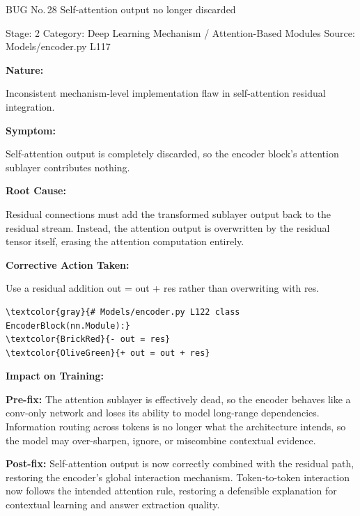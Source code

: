 \documentclass[10pt]{article}
\newcommand{\FieldLabel}[1]{%
 {\bfseries #1:}\par
}
\begin{document}
\begin{bugbox}{BUG No.\,28 \quad Self-attention output no longer discarded}
{\color{MetaGray}\small Stage: 2 \;\textbar\; Category: Deep Learning Mechanism / Attention-Based Modules \;\textbar\; Source: Models/encoder.py L117\par}
\vspace{0.22em}
\FieldLabel{Nature}
Inconsistent mechanism-level implementation flaw in self-attention residual integration.
\par
\vspace{0.35em}
\FieldLabel{Symptom}
Self-attention output is completely discarded, so the encoder block's attention sublayer contributes nothing.
\par
\vspace{0.35em}
\FieldLabel{Root Cause}
Residual connections must add the transformed sublayer output back to the residual stream. Instead, the attention output is overwritten by the residual tensor itself, erasing the attention computation entirely.
\par
\vspace{0.35em}
\FieldLabel{Corrective Action Taken}
Use a residual addition out = out + res rather than overwriting with res.
\par
\vspace{0.35em}
\begin{Verbatim}[commandchars=\\\{\},fontsize=\footnotesize,breaklines=true,breaksymbol={},frame=leftline,framerule=2pt,rulecolor=\color{gray!40},xleftmargin=6pt,formatcom=\singlespacing]
\textcolor{gray}{# Models/encoder.py L122 class EncoderBlock(nn.Module):}
\textcolor{BrickRed}{- out = res}
\textcolor{OliveGreen}{+ out = out + res}
\end{Verbatim}
\vspace{0.22em}
\FieldLabel{Impact on Training}
\textbf{Pre-fix:} The attention sublayer is effectively dead, so the encoder behaves like a conv-only network and loses its ability to model long-range dependencies. Information routing across tokens is no longer what the architecture intends, so the model may over-sharpen, ignore, or miscombine contextual evidence. \par\smallskip
\textbf{Post-fix:} Self-attention output is now correctly combined with the residual path, restoring the encoder's global interaction mechanism. Token-to-token interaction now follows the intended attention rule, restoring a defensible explanation for contextual learning and answer extraction quality. 
\par
\vspace{0.35em}
\end{bugbox}
\end{document}
